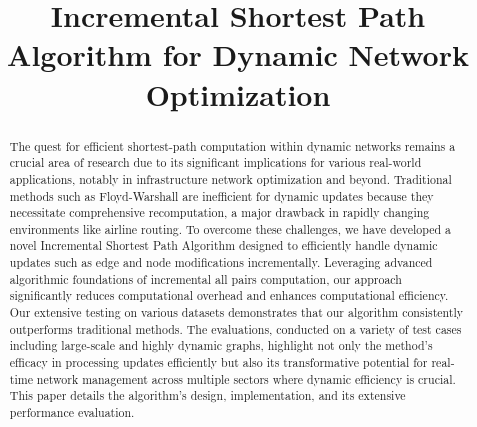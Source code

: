 \documentclass[conference]{IEEEtran}
\begin{document}
\title{Incremental Shortest Path Algorithm for Dynamic Network Optimization\\
}

\author{
\and
{}
\and
{}
}

\maketitle

\begin{abstract}
The quest for efficient shortest-path computation within dynamic networks remains a crucial area of research due to its significant implications for various real-world applications, notably in infrastructure network optimization and beyond. Traditional methods such as Floyd-Warshall are inefficient for dynamic updates because they necessitate comprehensive recomputation, a major drawback in rapidly changing environments like airline routing. To overcome these challenges, we have developed a novel Incremental Shortest Path Algorithm designed to efficiently handle dynamic updates such as edge and node modifications incrementally. Leveraging advanced algorithmic foundations of incremental all pairs computation, our approach significantly reduces computational overhead and enhances computational efficiency. Our extensive testing on various datasets demonstrates that our algorithm consistently outperforms traditional methods. The evaluations, conducted on a variety of test cases including large-scale and highly dynamic graphs, highlight not only the method's efficacy in processing updates efficiently but also its transformative potential for real-time network management across multiple sectors where dynamic efficiency is crucial. This paper details the algorithm's design, implementation, and its extensive performance evaluation.
\end{abstract}
\end{document}
